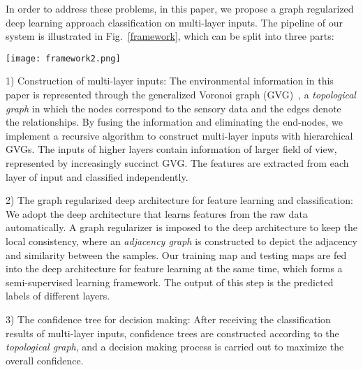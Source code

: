 \documentclass[letterpaper, 10 pt, conference]{ieeeconf}  %
\begin{document}
In order to address these problems, in this paper, we propose a graph regularized deep learning approach classification on multi-layer inputs.  The pipeline of our system is illustrated in Fig.~\ref{framework}, which can be split into three parts:

\begin{figure*}[tpb]
\centering
\texttt{[image: framework2.png]}
\caption{Pipeline of the semi-supervised learning system with multi-layer inputs.}
\label{framework}
\end{figure*}

1) Construction of multi-layer inputs: The environmental information in this paper is represented through the generalized Voronoi graph (GVG)~\cite{choset1995sensor}, a \emph{topological graph} in which the nodes correspond to the sensory data and the edges denote the relationships. By fusing the information and eliminating the end-nodes, we implement a recursive algorithm to construct multi-layer inputs with hierarchical GVGs. The inputs of higher layers contain information of larger field of view, represented by increasingly succinct GVG. The features are extracted from each layer of input and classified independently.

2) The graph regularized deep architecture for feature learning and classification: We adopt the deep architecture that learns features from the raw data automatically. A graph regularizer is imposed to the deep architecture to keep the local consistency, where an \emph{adjacency graph} is constructed to depict the adjacency and similarity between the samples. Our training map and testing maps are fed into the deep architecture for feature learning at the same time, which forms a semi-supervised learning framework. The output of this step is the predicted labels of different layers.

3) The confidence tree for decision making: After receiving the classification results of multi-layer inputs, confidence trees are constructed according to the \emph{topological graph}, and a decision making process is carried out to maximize the overall confidence.
\end{document}
